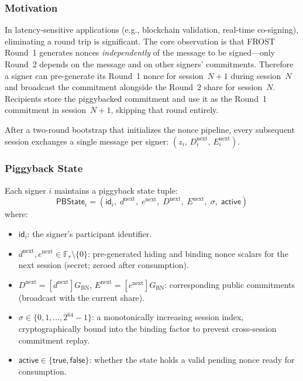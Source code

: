 \documentclass[11pt,a4paper]{article}
\newcommand{\F}{\mathbb{F}}
\newcommand{\Fr}{\F_r}
\newcommand{\genbn}{G_{\mathrm{BN}}}
\newcommand{\id}{\mathsf{id}}
\begin{document}
\subsubsection{Motivation}
\label{sec:piggyback-motivation}

In latency-sensitive applications (e.g., blockchain validation, real-time
co-signing), eliminating a round trip is significant.  The core observation is
that FROST Round~1 generates nonces \emph{independently} of the message to be
signed---only Round~2 depends on the message and on other signers'
commitments.  Therefore a signer can pre-generate its Round~1 nonce for
session~$N{+}1$ during session~$N$ and broadcast the commitment alongside the
Round~2 share for session~$N$.  Recipients store the piggybacked commitment
and use it as the Round~1 commitment in session~$N{+}1$, skipping that round
entirely.

After a two-round bootstrap that initializes the nonce pipeline, every
subsequent session exchanges a single message per signer:
$(z_i,\, D_i^{\mathrm{next}},\, E_i^{\mathrm{next}})$.

\subsubsection{Piggyback State}
\label{sec:piggyback-state}

Each signer $i$ maintains a piggyback state tuple:
\begin{equation}
  \mathsf{PBState}_i = (\id_i,\; d^{\mathrm{next}},\; e^{\mathrm{next}},\;
    D^{\mathrm{next}},\; E^{\mathrm{next}},\; \sigma,\; \mathsf{active})
  \label{eq:pbstate}
\end{equation}
where:
\begin{itemize}[nosep]
  \item $\id_i$: the signer's participant identifier.
  \item $d^{\mathrm{next}}, e^{\mathrm{next}} \in \Fr \setminus \{0\}$:
    pre-generated hiding and binding nonce scalars for the next session
    (secret; zeroed after consumption).
  \item $D^{\mathrm{next}} = [d^{\mathrm{next}}]\genbn$,\;
    $E^{\mathrm{next}} = [e^{\mathrm{next}}]\genbn$:
    corresponding public commitments (broadcast with the current share).
  \item $\sigma \in \{0, 1, \ldots, 2^{64}-1\}$: a monotonically increasing
    session index, cryptographically bound into the binding factor to prevent
    cross-session commitment replay.
  \item $\mathsf{active} \in \{\mathsf{true}, \mathsf{false}\}$: whether the
    state holds a valid pending nonce ready for consumption.
\end{itemize}
\end{document}
